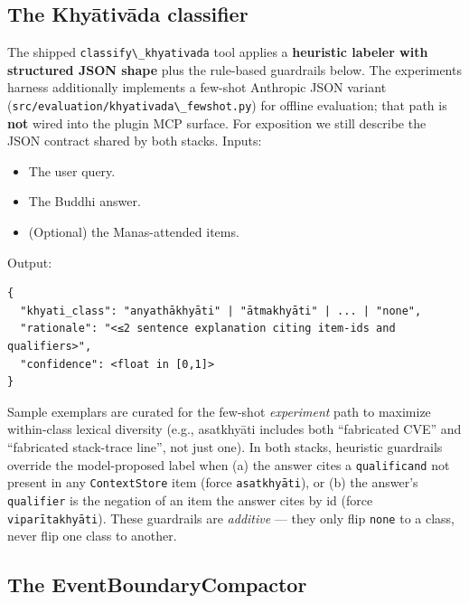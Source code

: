 \subsection{The Khyātivāda classifier}\label{the-khyux101tivux101da-classifier}

The shipped \passthrough{\lstinline!classify\_khyativada!} tool applies a \textbf{heuristic labeler with structured JSON shape} plus the rule-based guardrails below. The experiments harness additionally implements a few-shot Anthropic JSON variant (\passthrough{\lstinline!src/evaluation/khyativada\_fewshot.py!}) for offline evaluation; that path is \textbf{not} wired into the plugin MCP surface. For exposition we still describe the JSON contract shared by both stacks. Inputs:

\begin{itemize}
\tightlist
\item
  The user query.
\item
  The Buddhi answer.
\item
  (Optional) the Manas-attended items.
\end{itemize}

Output:

\begin{lstlisting}
{
  "khyati_class": "anyathākhyāti" | "ātmakhyāti" | ... | "none",
  "rationale": "<≤2 sentence explanation citing item-ids and qualifiers>",
  "confidence": <float in [0,1]>
}
\end{lstlisting}

Sample exemplars are curated for the few-shot \emph{experiment} path to maximize within-class lexical diversity (e.g., asatkhyāti includes both ``fabricated CVE'' and ``fabricated stack-trace line'', not just one). In both stacks, heuristic guardrails override the model-proposed label when (a) the answer cites a \passthrough{\lstinline!qualificand!} not present in any \passthrough{\lstinline!ContextStore!} item (force \passthrough{\lstinline!asatkhyāti!}), or (b) the answer's \passthrough{\lstinline!qualifier!} is the negation of an item the answer cites by id (force \passthrough{\lstinline!viparītakhyāti!}). These guardrails are \emph{additive} --- they only flip \passthrough{\lstinline!none!} to a class, never flip one class to another.

\subsection{The EventBoundaryCompactor}\label{the-eventboundarycompactor}

